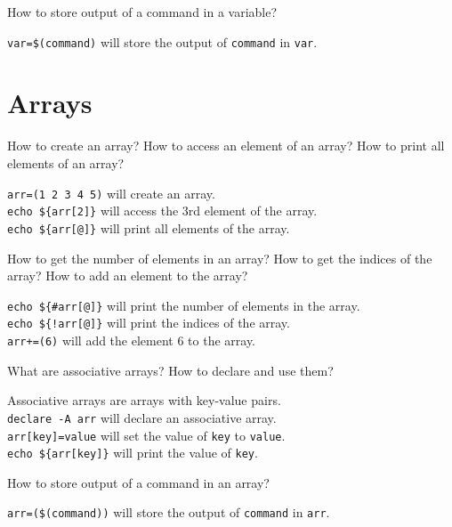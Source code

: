 \begin{qs}
  How to store output of a command in a variable?
\end{qs}

\begin{ans}
  \texttt{var=\$(command)} will store the output of \texttt{command} in \texttt{var}.
\end{ans}

\section{Arrays}

\begin{qs}
  How to create an array? How to access an element of an array?
  How to print all elements of an array?
\end{qs}

\begin{ans}
  \texttt{arr=(1 2 3 4 5)} will create an array. \\
  \texttt{echo \$\{arr[2]\}} will access the 3rd element of the array. \\
  \texttt{echo \$\{arr[@]\}} will print all elements of the array.
\end{ans}

\begin{qs}
  How to get the number of elements in an array?
  How to get the indices of the array?
  How to add an element to the array?
\end{qs}

\begin{ans}
  \texttt{echo \$\{\#arr[@]\}} will print the number of elements in the array. \\
  \texttt{echo \$\{!arr[@]\}} will print the indices of the array. \\
  \texttt{arr+=(6)} will add the element 6 to the array.
\end{ans}


\begin{qs}
  What are associative arrays? How to declare and use them?
\end{qs}

\begin{ans}
  Associative arrays are arrays with key-value pairs. \\
  \texttt{declare -A arr} will declare an associative array. \\
  \texttt{arr[key]=value} will set the value of \texttt{key} to \texttt{value}. \\
  \texttt{echo \$\{arr[key]\}} will print the value of \texttt{key}.
\end{ans}


\begin{qs}
  How to store output of a command in an array?
\end{qs}

\begin{ans}
  \texttt{arr=(\$(command))} will store the output of \texttt{command} in \texttt{arr}.
\end{ans}
